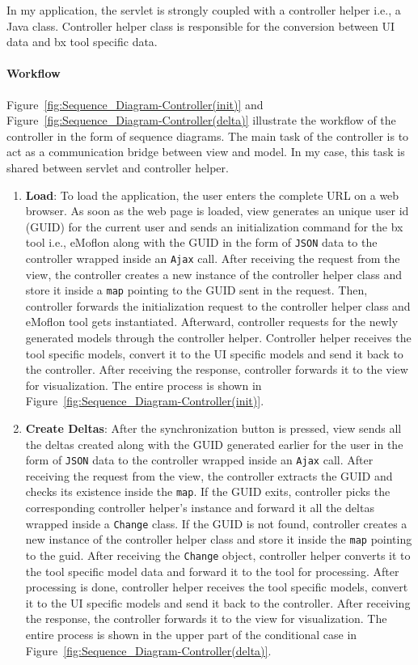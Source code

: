 In my application, the servlet is strongly coupled with a controller helper i.e., a Java class. Controller helper class is responsible for the conversion between UI data and bx tool specific data.

\paragraph{Workflow}
Figure~\ref{fig:Sequence_Diagram-Controller(init)} and Figure~\ref{fig:Sequence_Diagram-Controller(delta)} illustrate the workflow of the controller in the form of sequence diagrams. The main task of the controller is to act as a communication bridge between view and model. In my case, this task is shared between servlet and controller helper.

\begin{enumerate}
	\item {\textbf{Load}: To load the application, the user enters the complete URL on a web browser. As soon as the web page is loaded, view generates an unique user id (GUID) for the current user and sends an initialization command for the bx tool i.e., eMoflon along with the GUID in the form of \texttt{JSON} data to the controller wrapped inside an \texttt{Ajax} call. After receiving the request from the view, the controller creates a new instance of the controller helper class and store it inside a \texttt{map} pointing to the GUID sent in the request. Then, controller forwards the initialization request to the controller helper class and eMoflon tool gets instantiated. Afterward, controller requests for the newly generated models through the controller helper. Controller helper receives the tool specific models, convert it to the UI specific models and send it back to the controller. After receiving the response, controller forwards it to the view for visualization. The entire process is shown in Figure~\ref{fig:Sequence_Diagram-Controller(init)}.}
		
	\item {\textbf{Create Deltas}: After the synchronization button is pressed, view sends all the deltas created along with the GUID generated earlier for the user in the form of \texttt{JSON} data to the controller wrapped inside an \texttt{Ajax} call. After receiving the request from the view, the controller extracts the GUID and checks its existence inside the \texttt{map}. If the GUID exits, controller picks the corresponding controller helper's instance and forward it all the deltas wrapped inside a \texttt{Change} class. If the GUID is not found, controller creates a new instance of the controller helper class and store it inside the \texttt{map} pointing to the guid. After receiving the \texttt{Change} object, controller helper converts it to the tool specific model data and forward it to the tool for processing. After processing is done, controller helper receives the tool specific models, convert it to the UI specific models and send it back to the controller. After receiving the response, the controller forwards it to the view for visualization. The entire process is shown in the upper part of the conditional case in Figure~\ref{fig:Sequence_Diagram-Controller(delta)}.}
	

\end{enumerate}

